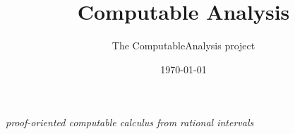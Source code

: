 \documentclass[11pt]{report}
\title{Computable Analysis}
\author{The ComputableAnalysis project}
\date{\today}
\begin{document}
\maketitle
\begin{center}
{\large\itshape proof-oriented computable calculus from rational intervals}
\end{center}

\tableofcontents
\clearpage


\end{document}
